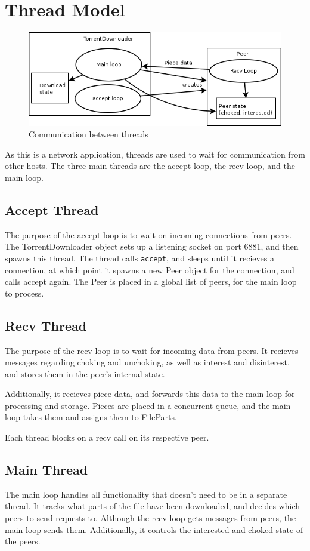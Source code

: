 \documentclass[letter]{scrartcl}
\begin{document}
\section{Thread Model}
\begin{figure}[h]
\centering
\includegraphics[scale=.5]{threads.png}
\caption{Communication between threads}
\end{figure}

As this is a network application, threads are used to wait for communication from other hosts. The three main threads are the accept loop, the recv loop, and the main loop.

\subsection{Accept Thread}
The purpose of the accept loop is to wait on incoming connections from peers. The TorrentDownloader object sets up a listening socket on port 6881, and then spawns this thread. The thread calls \texttt{accept}, and sleeps until it recieves a connection, at which point it spawns a new Peer object for the connection, and calls accept again. The Peer is placed in a global list of peers, for the main loop to process.

\subsection{Recv Thread}
The purpose of the recv loop is to wait for incoming data from peers. It recieves messages regarding choking and unchoking, as well as interest and disinterest, and stores them in the peer's internal state.

Additionally, it recieves piece data, and forwards this data to the main loop for processing and storage. Pieces are placed in a concurrent queue, and the main loop takes them and assigns them to FileParts.

Each thread blocks on a recv call on its respective peer.

\subsection{Main Thread}
The main loop handles all functionality that doesn't need to be in a separate thread. It tracks what parts of the file have been downloaded, and decides which peers to send requests to. Although the recv loop gets messages from peers, the main loop sends them. Additionally, it controls the interested and choked state of the peers.
\end{document}

